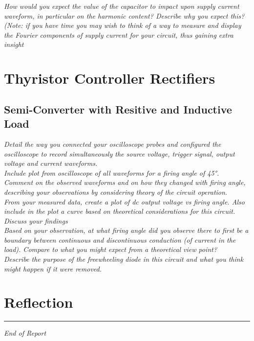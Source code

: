 \documentclass[12pt,a4paper]{article}
\begin{document}
\textit{How would you expect the value of the capacitor to impact upon supply current waveform, in
particular on the harmonic content? Describe why you expect this?
(Note: if you have time you may wish to think of a way to measure and display the Fourier
components of supply current for your circuit, thus gaining extra insight}\\
\section{Thyristor Controller Rectifiers}
\subsection{Semi-Converter with Resitive and Inductive Load}
\textit{Detail the way you connected your oscilloscope probes and configured the oscilloscope to record
simultaneously the source voltage, trigger signal, output voltage and current waveforms.}\\

\textit{Include plot from oscilloscope of all waveforms for a firing angle of 45°.}\\

\textit{Comment on the observed waveforms and on how they changed with firing angle, describing your
observations by considering theory of the circuit operation.}\\

\textit{From your measured data, create a plot of dc output voltage vs firing angle. Also include in the plot
a curve based on theoretical considerations for this circuit. Discuss your findings}\\

\textit{Based on your observation, at what firing angle did you observe there to first be a boundary between
continuous and discontinuous conduction (of current in the load). Compare to what you might expect
from a theoretical view point?}\\

\textit{Describe the purpose of the freewheeling diode in this circuit and what you think might happen if it
were removed.}\\

\section{Reflection}


\vfill
\hrule
\begin{center}
\textit{End of Report}
\end{center}
\end{document}
